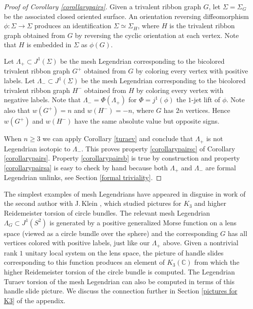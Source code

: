 \documentclass[JEP,XML,SOM,Unicode,NoFloatCountersInSection]{cedram}
\theoremstyle{plain}
\theoremstyle{definition}
\newcommand{\bC}{\mathbb{C}}\newcommand{\bD}{\mathbb{D}}
\begin{document}
\begin{proof}[Proof of Corollary \ref{corollarypairs}] Given a trivalent ribbon graph $G$, let $\Sigma=\Sigma_G$ be the associated closed oriented surface. An orientation reversing diffeomorphism $\phi: \Sigma \to \Sigma$ produces an identification $\Sigma \simeq \Sigma_{H}$, where $H$ is the trivalent ribbon graph obtained from $G$ by reversing the cyclic orientation at each vertex. Note that $H$ is embedded in $\Sigma$ as $\phi(G)$.

Let $\Lambda_+ \subset J^1(\Sigma)$ be the mesh Legendrian corresponding to the bicolored trivalent ribbon graph $G^+$ obtained from $G$ by coloring every vertex with positive labels. Let $\Lambda_- \subset J^1(\Sigma)$ be the mesh Legendrian corresponding to the bicolored trivalent ribbon graph $H^-$ obtained from $H$ by coloring every vertex with negative labels. Note that $\Lambda_-=\Phi(\Lambda_+)$ for $\Phi=j^1(\phi)$ the $1$-jet lift of $\phi$. Note also that $w(G^+)=n$ and $w(H^-)=-n$, where $G$ has $2n$ vertices. Hence $w(G^+)$ and $w( H^-)$ have the same absolute value but opposite signs.

When $n\geq 3$ we can apply Corollary \ref{turaev} and conclude that $\Lambda_+$ is not Legendrian isotopic to $\Lambda_-$. This proves property \eqref{corollarypairsc} of Corollary \ref{corollarypairs}. Property \eqref{corollarypairsb} is true by construction and property \eqref{corollarypairsa} is easy to check by hand because both $\Lambda_+$ and $\Lambda_-$ are formal Legendrian unlinks, see Section \ref{formal triviality}. \end{proof}
The simplest examples of mesh Legendrians have appeared in disguise in work of the second author with J.\,Klein \cite{IK93}, which studied pictures for $K_3$ and higher Reidemeister torsion of circle bundles. The relevant mesh Legendrian $\Lambda_G \subset J^1(S^2)$ is generated by a positive generalized Morse function on a lens space (viewed as a circle bundle over the sphere) and the corresponding $G$ has all vertices colored with positive labels, just like our $\Lambda_+$ above. Given a nontrivial rank $1$ unitary local system on the lens space, the picture of handle slides corresponding to this function produces an element of $K_3(\bC)$ from which the higher Reidemeister torsion of the circle bundle is computed. The Legendrian Turaev torsion of the mesh Legendrian can also be computed in terms of this handle slide picture. We discuss the connection further in Section \ref{pictures for K3} of the appendix.
\end{document}
